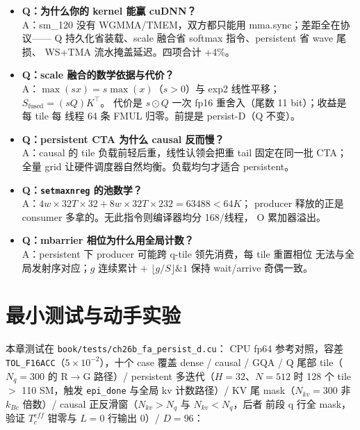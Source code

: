 \begin{itemize}[itemsep=1pt]
  \item \textbf{Q：为什么你的 kernel 能赢 cuDNN？}\\
        A：sm\_120 没有 WGMMA/TMEM，双方都只能用 mma.sync；差距全在协议——
        Q 持久化省装载、scale 融合省 softmax 指令、persistent 省 wave 尾损、
        WS+TMA 流水掩盖延迟。四项合计 +4\%。
  \item \textbf{Q：scale 融合的数学依据与代价？}\\
        A：$\max(sx)=s\max(x)$（$s>0$）与 exp2 线性平移；$S_{\text{fused}}=(sQ)K^\top$。
        代价是 $s\odot Q$ 一次 fp16 重舍入（尾数 11 bit）；收益是每 tile 每
        线程 64 条 FMUL 归零。前提是 persist-D（Q 不变）。
  \item \textbf{Q：persistent CTA 为什么 causal 反而慢？}\\
        A：causal 的 tile 负载前轻后重，线性认领会把重 tail 固定在同一批
        CTA；全量 grid 让硬件调度器自然均衡。负载均匀才适合 persistent。
  \item \textbf{Q：\texttt{setmaxnreg} 的池数学？}\\
        A：$4w\times 32T\times 32 + 8w\times 32T\times 232 = 63488 < 64K$；
        producer 释放的正是 consumer 多拿的。无此指令则编译器均分 168/线程，
        O 累加器溢出。
  \item \textbf{Q：mbarrier 相位为什么用全局计数？}\\
        A：persistent 下 producer 可能跨 q-tile 领先消费，每 tile 重置相位
        无法与全局发射序对应；$g$ 连续累计 + $\lfloor g/S\rfloor\&1$ 保持
        wait/arrive 奇偶一致。
\end{itemize}

\section{最小测试与动手实验}\label{sec:26b-test}

本章测试在 \texttt{book/tests/ch26b\_\allowbreak{}fa\_\allowbreak{}persist\_\allowbreak{}d.cu}：
CPU fp64 参考对照，容差 \texttt{TOL\_F16ACC}（$5\times 10^{-2}$），十个 case 覆盖
dense / causal / GQA / Q 尾部 tile（$N_q{=}300$ 的 R$\to$G 路径）/
persistent 多迭代（$H{=}32$、$N{=}512$ 时 128 个 tile $>$ 110 SM，触发
\texttt{epi\_done} 与全局 kv 计数路径）/ KV 尾 mask（$N_{kv}{=}300$ 非
$k_{Bc}$ 倍数）/ causal 正反滑窗（$N_{kv}{>}N_q$ 与 $N_{kv}{<}N_q$，后者
前段 q 行全 mask，验证 $T_c^{eff}$ 钳零与 $L{=}0$ 行输出 0）/ $D{=}96$：


